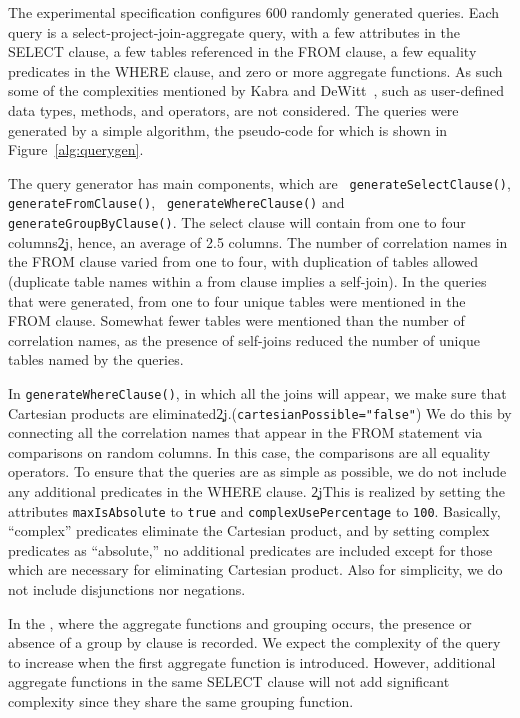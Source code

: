 The experimental specification configures 600 randomly generated
queries. Each query
is a select-project-join-aggregate query, with a few attributes in the
SELECT clause, a few tables referenced in the FROM clause, a few
equality predicates in the WHERE clause, and zero or more aggregate
functions. As such some of the complexities
mentioned by Kabra and DeWitt~\cite{kabra98}, such as
user-defined data types, methods, and operators, are not considered.
The queries were generated
by a simple algorithm, the pseudo-code for which is shown in
Figure~\ref{alg:querygen}.

The query generator has  
main components, which are {\tt
  generateSelectClause()}, {\tt generateFromClause()}, {\tt
  generateWhereClause()} and {\tt generateGroupByClause()}. 
The select clause will contain from one to four
columns\c2j{}{, hence, an average of 2.5 columns}. The number of
correlation names
in the FROM clause varied from one to four, with duplication of tables
allowed (duplicate table names within a from clause implies a self-join).
In the queries that were generated, from one to four unique tables were
mentioned in the FROM clause. Somewhat fewer tables were mentioned than the
number of correlation names, as the presence of self-joins reduced the
number of unique tables named by the queries.

In {\tt generateWhereClause()}, in which all the joins will appear, we make
sure that Cartesian products are
eliminated\c2j{.}{(\verb.cartesianPossible="false".)}  We do this by
connecting all the correlation names that appear in the FROM statement via
comparisons on random columns. In this case, the comparisons are all
equality operators. To ensure that the queries are as simple as possible, we
do not include any additional predicates in the WHERE clause.  \c2j{}{This
  is realized by setting the attributes {\tt maxIsAbsolute} to {\tt true}
  and {\tt complexUsePercentage} to {\tt 100}.  Basically, ``complex''
  predicates eliminate the Cartesian product, and by setting complex
  predicates as ``absolute,'' no additional predicates are included except
  for those which are necessary for eliminating Cartesian product.} Also for
simplicity, we do not include disjunctions nor negations.

In the , where the aggregate
functions and
grouping occurs, the presence or absence of a group by clause is
recorded. We expect the
complexity of the query to increase when the first aggregate function
is introduced. However,
additional aggregate functions in the same SELECT clause will not add
significant complexity since
they share the same grouping function.

